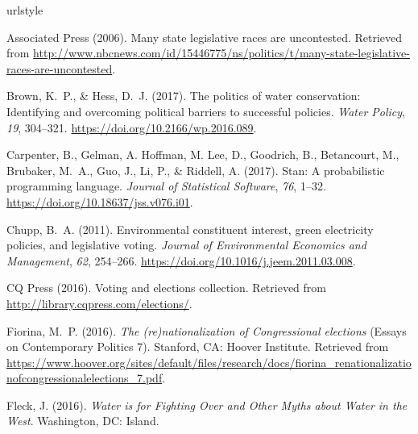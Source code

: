 \documentclass[draft,linenumbers]{agujournal}\usepackage{knitr}
\begin{document}
\begin{thebibliography}{33}
\providecommand{\natexlab}[1]{#1}
\expandafter\ifx\csname urlstyle\endcsname\relax
  \providecommand{\doi}[1]{doi:\discretionary{}{}{}#1}\else
  \providecommand{\doi}{doi:\discretionary{}{}{}\begingroup
  \urlstyle{rm}\Url}\fi

  Associated Press (2006).
  Many state legislative races are uncontested.
  Retrieved from
  \url{http://www.nbcnews.com/id/15446775/ns/politics/t/many-state-legislative-races-are-uncontested}.

  Brown, K.~P., \& Hess, D.~J. (2017).
  The politics of water conservation:
  Identifying and overcoming political barriers to successful policies.
  \textit{Water Policy}, \textit{19}, 304--321.
  \url{https://doi.org/10.2166/wp.2016.089}.

  Carpenter, B., Gelman, A. Hoffman, M. Lee, D., Goodrich, B., Betancourt, M.,
  Brubaker, M.~A., Guo, J., Li, P., \& Riddell, A. (2017).
  Stan: A probabilistic programming language.
  \textit{Journal of Statistical Software}, \textit{76}, 1--32.
  \url{https://doi.org/10.18637/jss.v076.i01}.

  Chupp, B.~A. (2011).
  Environmental constituent interest, green electricity policies, and legislative voting.
  \textit{Journal of Environmental Economics and Management}, \textit{62}, 254--266.
  \url{https://doi.org/10.1016/j.jeem.2011.03.008}.

{CQ Press} (2016).
  Voting and elections collection.
  Retrieved from
  \url{http://library.cqpress.com/elections/}.

  Fiorina, M.~P. (2016).
  \textit{The (re)nationalization of {C}ongressional elections\/}
  (Essays on Contemporary Politics 7).
  Stanford, CA: Hoover Institute.
  Retrieved from
  \url{https://www.hoover.org/sites/default/files/research/docs/fiorina_renationalizationofcongressionalelections_7.pdf}.

  Fleck, J. (2016).
  \textit{Water is for Fighting Over and Other Myths about Water in the West}.
  Washington, DC: Island.


\end{thebibliography}
\end{document}
